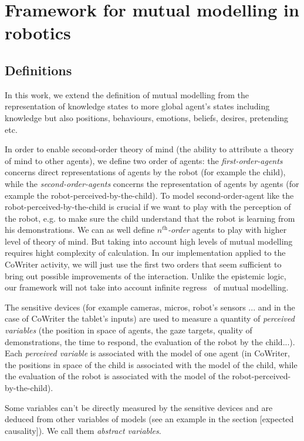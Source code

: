 \documentclass[10pt,a4paper]{article}
\begin{document}
\section{Framework for mutual modelling in robotics}\label{framework}

\subsection{Definitions}
In this work, we extend the definition of mutual modelling from the representation of knowledge states to more global agent's states including knowledge but also positions, behaviours, emotions, beliefs, desires, pretending etc. 

In order to enable second-order theory of mind (the ability to attribute a theory of mind to other agents), we define two order of agents: the \textit{first-order-agents} concerns direct representations of agents by the robot (for example the child), while the \textit{second-order-agents} concerns the representation of agents by agents (for example the robot-perceived-by-the-child). To model second-order-agent like the robot-perceived-by-the-child is crucial if we want to play with the perception of the robot, e.g. to make sure the child understand that the robot is learning from his demonstrations. We can as well define \textit{$n^{\textit{th}}$-order} agents to play with higher level of theory of mind. But taking into account high levels of mutual modelling requires hight complexity of calculation. In our implementation applied to the CoWriter activity, we will just use the first two orders that seem sufficient to bring out possible improvements of the interaction. Unlike the epistemic logic, our framework will not take into account infinite regress~\cite{clark1991grounding} of mutual modelling. 

The sensitive devices (for example cameras, micros, robot's sensors ... and in the case of CoWriter the tablet's inputs) are used to measure a quantity of \textit{perceived variables} (the position in space of agents, the gaze targets, quality of demonstrations, the time to respond, the evaluation of the robot by the child...). Each \textit{perceived variable} is associated with the model of one agent (in CoWriter, the positions in space of the child is associated with the model of the child, while the evaluation of the robot is associated with the model of the robot-perceived-by-the-child). 

Some variables can't be directly measured by the sensitive devices and are deduced from other variables of models (see an example in the section [expected causality]). We call them \textit{abstract variables}. 
\end{document}
